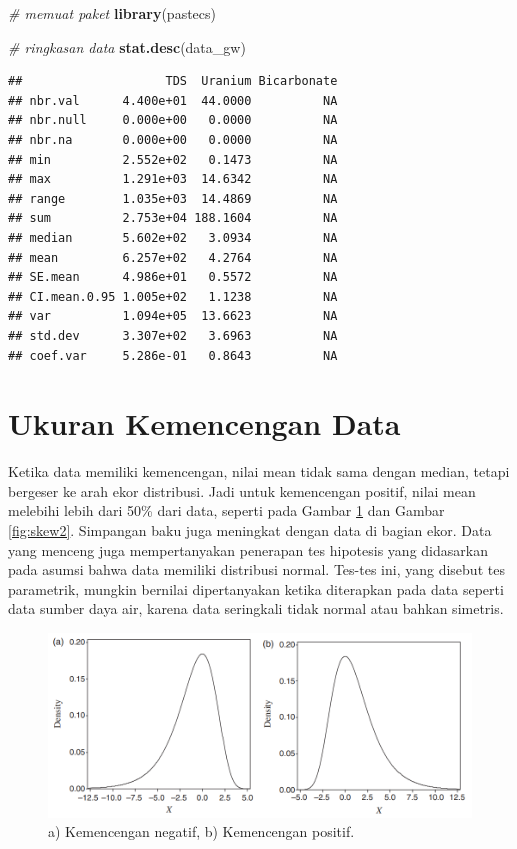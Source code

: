 \documentclass[]{book}
\newenvironment{Shaded}{\begin{snugshade}}{\end{snugshade}}
\newcommand{\KeywordTok}[1]{\textcolor[rgb]{0.13,0.29,0.53}{\textbf{#1}}}
\newcommand{\CommentTok}[1]{\textcolor[rgb]{0.56,0.35,0.01}{\textit{#1}}}
\newcommand{\NormalTok}[1]{#1}
\begin{document}
\begin{Shaded}
\begin{Highlighting}[]
\CommentTok{# memuat paket}
\KeywordTok{library}\NormalTok{(pastecs)}

\CommentTok{# ringkasan data}
\KeywordTok{stat.desc}\NormalTok{(data_gw)}
\end{Highlighting}
\end{Shaded}

\begin{verbatim}
##                    TDS  Uranium Bicarbonate
## nbr.val      4.400e+01  44.0000          NA
## nbr.null     0.000e+00   0.0000          NA
## nbr.na       0.000e+00   0.0000          NA
## min          2.552e+02   0.1473          NA
## max          1.291e+03  14.6342          NA
## range        1.035e+03  14.4869          NA
## sum          2.753e+04 188.1604          NA
## median       5.602e+02   3.0934          NA
## mean         6.257e+02   4.2764          NA
## SE.mean      4.986e+01   0.5572          NA
## CI.mean.0.95 1.005e+02   1.1238          NA
## var          1.094e+05  13.6623          NA
## std.dev      3.307e+02   3.6963          NA
## coef.var     5.286e-01   0.8643          NA
\end{verbatim}

\section{Ukuran Kemencengan Data}\label{ukuran-kemencengan-data}

Ketika data memiliki kemencengan, nilai mean tidak sama dengan median,
tetapi bergeser ke arah ekor distribusi. Jadi untuk kemencengan positif,
nilai mean melebihi lebih dari 50\% dari data, seperti pada Gambar
\ref{fig:skew} dan Gambar \ref{fig:skew2}. Simpangan baku juga meningkat
dengan data di bagian ekor. Data yang menceng juga mempertanyakan
penerapan tes hipotesis yang didasarkan pada asumsi bahwa data memiliki
distribusi normal. Tes-tes ini, yang disebut tes parametrik, mungkin
bernilai dipertanyakan ketika diterapkan pada data seperti data sumber
daya air, karena data seringkali tidak normal atau bahkan simetris.

\begin{figure}

{\centering \includegraphics[width=0.7\linewidth]{skewness} 

}

\caption{a) Kemencengan negatif, b) Kemencengan positif.}\label{fig:skew}
\end{figure}
\end{document}
